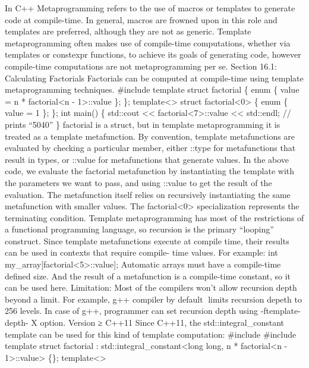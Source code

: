 In C++ Metaprogramming refers to the use of macros or templates to
generate code at compile-time. In general, macros are frowned upon in
this role and templates are preferred, although they are not as generic.
Template metaprogramming often makes use of compile-time computations,
whether via templates or constexpr functions, to achieve its goals of
generating code, however compile-time computations are not
metaprogramming per se. Section 16.1: Calculating Factorials Factorials
can be computed at compile-time using template metaprogramming
techniques. \#include template struct factorial \{ enum \{ value = n *
factorial\textless n - 1\textgreater::value \}; \};
template\textless\textgreater{} struct factorial\textless0\textgreater{}
\{ enum \{ value = 1 \}; \}; int main() \{ std::cout
\textless\textless{} factorial\textless7\textgreater::value
\textless\textless{} std::endl; // prints ``5040'' \} factorial is a
struct, but in template metaprogramming it is treated as a template
metafunction. By convention, template metafunctions are evaluated by
checking a particular member, either ::type for metafunctions that
result in types, or ::value for metafunctions that generate values. In
the above code, we evaluate the factorial metafunction by instantiating
the template with the parameters we want to pass, and using ::value to
get the result of the evaluation. The metafunction itself relies on
recursively instantiating the same metafunction with smaller values. The
factorial\textless0\textgreater{} specialization represents the
terminating condition. Template metaprogramming has most of the
restrictions of a functional programming language, so recursion is the
primary ``looping'' construct. Since template metafunctions execute at
compile time, their results can be used in contexts that require
compile- time values. For example: int
my\_array{[}factorial\textless5\textgreater::value{]}; Automatic arrays
must have a compile-time deﬁned size. And the result of a metafunction
is a compile-time constant, so it can be used here. Limitation: Most of
the compilers won't allow recursion depth beyond a limit. For example,
g++ compiler by default limits recursion depeth to 256 levels. In case
of g++, programmer can set recursion depth using -ftemplate-depth- X
option. Version ≥ C++11 Since C++11, the std::integral\_constant
template can be used for this kind of template computation: \#include
\#include template struct factorial :
std::integral\_constant\textless long long, n * factorial\textless n -
1\textgreater::value\textgreater{} \{\}; template\textless\textgreater{}
